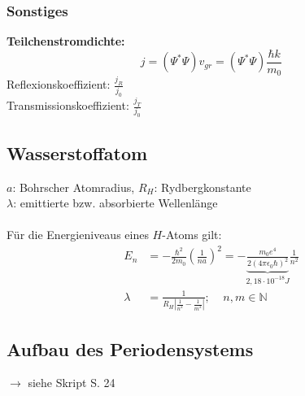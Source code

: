 \documentclass[a4paper,twocolumn,10pt]{article}
\begin{document}
\subsubsection{Sonstiges}
\textbf{Teilchenstromdichte:}
\begin{equation*}
j=(\Psi^*\Psi)v_{gr}=(\Psi^*\Psi)\frac{\hbar k}{m_0}
\end{equation*}
Reflexionskoeffizient: $\frac{j_R}{j_0}$\\
Transmissionskoeffizient: $\frac{j_T}{j_0}$

\subsection{Wasserstoffatom}
$a$: Bohrscher Atomradius, $R_H$: Rydbergkonstante\\
$\lambda$: emittierte bzw. absorbierte Wellenlänge\\\\
Für die Energieniveaus eines $H$-Atoms gilt:
\begin{equation*}
\begin{split}
E_n&=-\frac{\hbar^2}{2m_0}\left(\frac{1}{na}\right)^2=-\underbrace{\frac{m_0e^4}{2(4\pi\epsilon_0\hbar)^2}}_{2,18\cdot 10^{-18}J}\frac{1}{n^2}\\
\lambda&=\frac{1}{R_H\left|\frac{1}{n^2}-\frac{1}{m^2}\right|};\;\;\;\;n,m\in\mathbb{N}
\end{split}
\end{equation*}

\subsection{Aufbau des Periodensystems}
$\rightarrow$ siehe Skript S. 24
\end{document}
